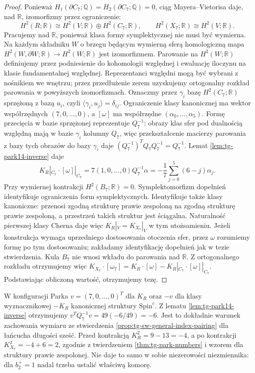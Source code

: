 \begin{proof}
Ponieważ $H_1(\partial C_7;\mathbb Q)
=H_2(\partial C_7;\mathbb Q)=0$,
ciąg Mayera--Vietorisa daje, nad $\mathbb R$,
izomorfizmy przez ograniczenie:
\[
H^2(R;\mathbb R)\cong H^2(V;\mathbb R)\oplus H^2(C_7;\mathbb R),
\qquad H^2(X_7;\mathbb R)\cong H^2(V;\mathbb R).
\]
Pracujemy nad $\mathbb R$, ponieważ klasa formy
symplektycznej nie musi być wymierna. Na każdym
składniku $W$ o brzegu będącym wymierną sferą
homologiczną mapa $H^2(W,\partial W;\mathbb R)
\to H^2(W;\mathbb R)$ jest izomorfizmem.
Parowanie na $H^2(W;\mathbb R)$ definiujemy
przez podniesienie do kohomologii względnej
i ewaluację iloczynu na klasie fundamentalnej
względnej. Reprezentanci względni mogą być
wybrani z nośnikiem we wnętrzu; przez przedłużenie
zerem uzyskujemy ortogonalny rozkład parowania
w powyższych izomorfizmach.
Oznaczmy przez $\gamma_i$ bazę $H^2(C_7;\mathbb R)$
sprzężoną z bazą $u_i$, czyli
$\langle\gamma_i,u_j\rangle=\delta_{ij}$. Ograniczenie klasy kanonicznej ma
wektor współrzędnych $(7,0,\ldots,0)$, a $[\omega]$
ma współrzędne $(\alpha_0,\ldots,\alpha_5)$.
Formę przecięcia w bazie sprzężonej reprezentuje
$Q_7^{-1}$: obrazy klas sfer pod dualnością względną
mają w bazie $\gamma_i$ kolumny $Q_7$, więc
przekształcenie macierzy parowania z bazy tych
obrazów do bazy $\gamma_i$ daje
$(Q_7^{-1})^TQ_7Q_7^{-1}=Q_7^{-1}$.
Lemat \ref{lem:tg-park14-inverse} daje
\[
K_R|_{C_7}\cdot[\omega]|_{C_7}
  =7(1,0,\ldots,0)Q_7^{-1}\alpha
  =-\frac17\sum_{j=0}^{5}(6-j)\alpha_j.
\]
Przy wymiernej kontrakcji $H^2(B_7;\mathbb R)=0$.
Symplektomorfizm dopełnień identyfikuje ograniczenia
form symplektycznych. Identyfikuje także klasy kanoniczne:
przenosi zgodną strukturę prawie zespoloną na zgodną
strukturę prawie zespoloną, a przestrzeń takich struktur
jest ściągalna. Naturalność pierwszej klasy Cherna daje
więc $K_R|_V=K_{X_7}|_V$ w tym utożsamieniu.
Jeżeli konstrukcja wymaga uprzedniego dostosowania
otoczenia sfer, przez $\omega$ rozumiemy formę po tym
dostosowaniu; zakładamy identyfikację dopełnień jak
w tezie stwierdzenia. Kula $B_7$ nie wnosi wkładu
do parowania nad $\mathbb R$. Z ortogonalnego rozkładu
otrzymujemy więc
$K_{X_7}\cdot[\omega_7]
=K_R\cdot[\omega]-K_R|_{C_7}\cdot[\omega]|_{C_7}$.
Podstawiając obliczoną wartość, otrzymujemy tezę.
\end{proof}

\begin{uwaga}
W konfiguracji Parka $v=(7,0,\ldots,0)^T$ dla
$K_R$ oraz $-v$ dla klasy wyznacznikowej $-K_R$
kanonicznej struktury $\mathrm{Spin}^c$.
Z lematu \ref{lem:tg-park14-inverse} otrzymujemy
$v^TQ_7^{-1}v=49(-6/49)=-6$.
Jest to dokładnie warunek zachowania wymiaru
ze stwierdzenia \ref{prop:tg-sw-general-index-pairing}
dla łańcucha długości sześć.
Przed kontrakcją $K_R^2=9-13=-4$,
a po kontrakcji $K_{X_7}^2=-4+6=2$,
zgodnie z twierdzeniem \ref{thm:tg-park-numbers}
i wzorem dla struktury prawie zespolonej.
Nie daje to samo w sobie niezerowości niezmiennika:
dla $b_2^+=1$ nadal trzeba ustalić właściwą komorę.
\end{uwaga}


